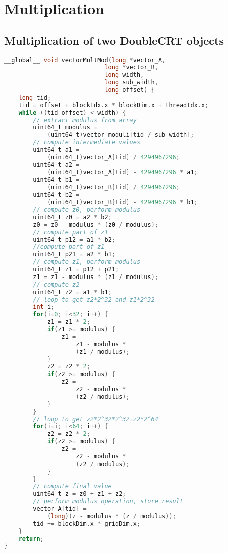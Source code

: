\section{Multiplication} \label{sec:KernelMultiplication}
\subsection{Multiplication of two DoubleCRT objects}
\begin{lstlisting}[language=C,caption={Multiplication Kernel for Two DoubleCRT}]
__global__ void vectorMultMod(long *vector_A, 
                            long *vector_B, 
                            long width, 
                            long sub_width, 
                            long offset) {
	long tid;
	tid = offset + blockIdx.x * blockDim.x + threadIdx.x;
	while ((tid-offset) < width) {
	    // extract modulus from array
		uint64_t modulus = 
		    (uint64_t)vector_moduli[tid / sub_width];
		// compute intermediate values
		uint64_t a1 = 
		    (uint64_t)vector_A[tid] / 4294967296;
		uint64_t a2 = 
		    (uint64_t)vector_A[tid] - 4294967296 * a1;
		uint64_t b1 = 
		    (uint64_t)vector_B[tid] / 4294967296;
		uint64_t b2 = 
		    (uint64_t)vector_B[tid] - 4294967296 * b1;
        // compute z0, perform modulus
		uint64_t z0 = a2 * b2;
		z0 = z0 - modulus * (z0 / modulus);
        // compute part of z1
		uint64_t p12 = a1 * b2;
        //compute part of z1
		uint64_t p21 = a2 * b1;
        // compute z1, perform modulus
		uint64_t z1 = p12 + p21;
		z1 = z1 - modulus * (z1 / modulus);
		// compute z2
		uint64_t z2 = a1 * b1;
        // loop to get z2*2^32 and z1*2^32
		int i;
		for(i=0; i<32; i++) {
			z1 = z1 * 2;
			if(z1 >= modulus) {
				z1 = 
				    z1 - modulus * 
				    (z1 / modulus);
			}
			z2 = z2 * 2;
			if(z2 >= modulus) {
				z2 = 
				    z2 - modulus * 
				    (z2 / modulus);
			}
		}
        // loop to get z2*2^32*2^32=z2*2^64
		for(i=i; i<64; i++) {
			z2 = z2 * 2;
			if(z2 >= modulus) {
				z2 = 
				    z2 - modulus *
				    (z2 / modulus);
			}
		}
        // compute final value
		uint64_t z = z0 + z1 + z2;
		// perform modulus operation, store result
		vector_A[tid] = 
		    (long)(z - modulus * (z / modulus));
		tid += blockDim.x * gridDim.x;
	}
	return;
}
\end{lstlisting}

